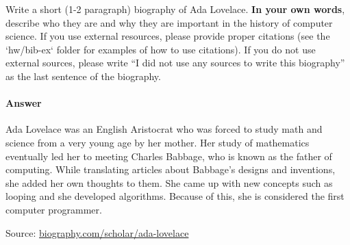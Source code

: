 \documentclass{article}
\begin{document}

Write a short (1-2 paragraph) biography of Ada Lovelace.
\textbf{In your own words}, describe who they are and why they are important in
the history of computer science.  If you use external resources, please provide
proper citations (see the `hw/bib-ex` folder for examples of how to use
citations). If you do not use external sources, please write ``I did not
use any sources to write this biography'' as the last sentence of the
biography.

\paragraph{Answer}

Ada Lovelace was an English Aristocrat who was forced to study 
math and science from a very young age by her mother. Her study 
of mathematics eventually led her to meeting Charles Babbage, who 
is known as the father of computing. While translating articles about
Babbage's designs and inventions, she added her own thoughts to them.
She came up with new concepts such as looping and she developed algorithms.
Because of this, she is considered the first computer programmer.

Source: \url{biography.com/scholar/ada-lovelace}

% 
% 
\end{document}

